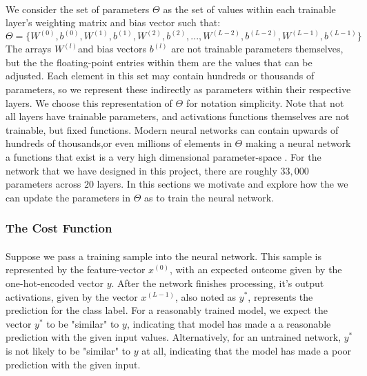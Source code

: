 \documentclass[12pt,letterpaper]{article}
\begin{document}
\paragraph*{}We consider the set of parameters $\Theta$ as the set of values within each trainable layer's weighting matrix and bias vector such that:
\begin{equation}
\label{eqn-Theta}
\Theta = \big\{
W^{(0)}, b^{(0)}, W^{(1)}, b^{(1)}, W^{(2)}, b^{(2)}, ... ,W^{(L-2)}, b^{(L-2)}, W^{(L-1)}, b^{(L-1)}
\big\}
\end{equation}
The arrays $W^{(l)}$and bias vectors $b^{(l)}$ are not trainable parameters themselves, but the the floating-point entries within them are the values that can be adjusted. Each element in this set may contain hundreds or thousands of parameters, so we represent these indirectly as parameters within their respective layers. We choose this representation of $\Theta$ for notation simplicity. Note that not all layers have trainable parameters, and activations functions themselves are not trainable, but fixed functions. Modern neural networks can contain upwards of hundreds of thousands,or even millions of elements in $\Theta$ making a neural network a functions that exist is a very high dimensional parameter-space \cite{Geron,Goodfellow,Levine}. For the network that we have designed in this project, there are roughly $33,000$ parameters across $20$ layers. In this sections we motivate and explore how the we can update the parameters in $\Theta$ as to train the neural network.


\subsubsection{The Cost Function}

\paragraph*{}Suppose we pass a training sample into the neural network. This sample is represented by the feature-vector $x^{(0)}$, with an expected outcome given by the one-hot-encoded vector $y$.  After the network finishes processing, it's output activations, given by the vector $x^{(L-1)}$, also noted as $y^*$, represents the prediction for the class label. For a reasonably trained model, we expect the vector $y^*$ to be "similar" to $y$, indicating that model has made a a reasonable prediction with the given input values. Alternatively, for an untrained network, $y^*$ is not likely to be "similar" to $y$ at all, indicating that the model has made a poor prediction with the given input.
\end{document}
